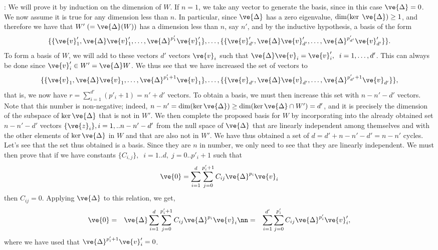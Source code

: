 \pru:
We will prove it by induction on the dimension of $W$. If $n=1$, we take any vector to generate the basis, since in this case $\ve{\Delta}=0$.
We now assume it is true for any dimension less than $n$.
In particular, since $\ve{\Delta}$ has a zero eigenvalue, 
$\dim(\ker \; \ve{\Delta}) \geq 1$, and therefore we have that $W' \;(= \ve{\Delta}(W))$
has a dimension less than $n$, say $n'$, and by the inductive hypothesis, a basis of the form
\[
\{\{\ve{v}'_1, \ve{\Delta}\ve{v}'_1, \ldots ,\ve{\Delta}^{p'_1}\ve{v}'_1\},\ldots,
\{\{\ve{v}'_{d'}, \ve{\Delta}\ve{v}'_{d'}, \ldots ,\ve{\Delta}^{p'_{d'}}\ve{v}'_{d'}\}\}
.
\]
% 
To form a basis of $W$, we will add to these vectors $d'$ vectors 
$\ve{v}_i$ such that $ \ve{\Delta}\ve{v}_i = \ve{v}'_i, \;\;i=1,\dots,d'$.
This can always be done since $\ve{v}'_i \in W' = \ve{\Delta}W$.
%
We thus see that we have increased the set of vectors to
\[
\{\{\ve{v}_1, \ve{\Delta}\ve{v}_1, \ldots ,\ve{\Delta}^{p'_1+1}\ve{v}_1\},\ldots,
\{\{\ve{v}_{d'}, \ve{\Delta}\ve{v}_{d'}, \ldots ,\ve{\Delta}^{p'_{d'}+1}\ve{v}_{d'}\}\},
\]
%
that is, we now have $r=\sum_{i=1}^{d'} (p'_i+1)= n' + d'$ vectors. 
%
To obtain a basis, we must then increase this set with $n-n'-d'$ vectors. 
Note that this number is non-negative; indeed, 
$n-n'= \dim(\ker\ve{\Delta}) \geq \dim(\ker\ve{\Delta} \cap W') = d'$, 
and it is precisely the dimension of the subspace of 
$\ker\ve{\Delta}$ that is not in $W'$.
We then complete the proposed basis for $W$ by incorporating into the already obtained set $n-n'-d'$ vectors $\{\ve{z}_i\}, i=1,..n-n'-d'$ from the null space of $\ve{\Delta}$
that are linearly independent among themselves and with the other elements of $\ker \ve{\Delta}$
in $W$ and that are also not in $W'$.
We have thus obtained a set of $d=d'+n-n'-d'=n-n'$ cycles.
Let's see that the set thus obtained is a basis. 
Since they are $n$ in number, we only need to see that they are linearly independent.
We must then prove that if we have constants $\{C_{i,j}\},\;\; i=1..d,\;j=0..p'_i+1$
such that 
\begin{equation}
  \ve{0} = \sum_{i=1}^d \sum_{j=0}^{p'_i+1} C_{ij}\ve{\Delta}^{p_i}\ve{v}_i
\end{equation}
then $C_{ij}=0$.
Applying $\ve{\Delta}$ to this relation, we get,
\begin{eqnarray}
  \ve{0} &=& \ve{\Delta}\sum_{i=1}^d \sum_{j=0}^{p'_i+1} C_{ij}\ve{\Delta}^{p_i}\ve{v}_i \nn 
         &=& \sum_{i=1}^{d'} \sum_{j=0}^{p'_i} C_{ij}\ve{\Delta}^{p'_i}\ve{v}'_i,
\end{eqnarray}
where we have used that $\ve{\Delta}^{p'_i+1}\ve{v}'_i=0$.
